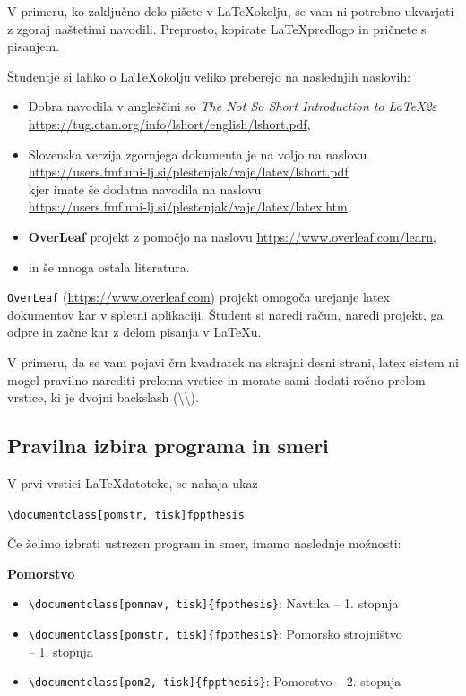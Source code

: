 \documentclass[12pt]{article}
\theoremstyle{definition}
\begin{document}
V primeru, ko zaključno delo pišete v \LaTeX okolju, se vam ni potrebno ukvarjati z zgoraj naštetimi navodili. Preprosto, kopirate \LaTeX predlogo in pričnete s pisanjem.

Študentje si lahko o \LaTeX okolju veliko preberejo na naslednjih naslovih:

\begin{itemize}
	\item Dobra navodila v angleščini so \textit{The Not So Short Introduction to \LaTeX 2$\varepsilon$}\\
	\url{https://tug.ctan.org/info/lshort/english/lshort.pdf},
	\item Slovenska verzija zgornjega dokumenta je na voljo na naslovu\\ \href{https://users.fmf.uni-lj.si/plestenjak/vaje/latex/lshort.pdf}{https://users.fmf.uni-lj.si/plestenjak/vaje/latex/lshort.pdf}\\
	kjer imate še dodatna navodila na naslovu\\
	\href{https://users.fmf.uni-lj.si/plestenjak/vaje/latex/latex.htm}{https://users.fmf.uni-lj.si/plestenjak/vaje/latex/latex.htm}
	\item \textbf{OverLeaf} projekt z pomočjo na naslovu \url{https://www.overleaf.com/learn},
	\item in še mnoga ostala literatura. 
\end{itemize}

\texttt{OverLeaf} (\url{https://www.overleaf.com}) projekt omogoča urejanje latex dokumentov kar v spletni aplikaciji. Študent si naredi račun, naredi projekt, ga odpre in začne kar z delom pisanja v \LaTeX u.

V primeru, da se vam pojavi črn kvadratek na skrajni desni strani, latex sistem ni mogel pravilno narediti preloma vrstice in morate sami dodati ročno prelom vrstice, ki je dvojni backslash (\textbackslash\textbackslash).


\subsection{Pravilna izbira programa in smeri}

V prvi vrstici \LaTeX datoteke, se nahaja ukaz

\texttt{\textbackslash documentclass[pomstr, tisk]{fppthesis}}

Če želimo izbrati ustrezen program in smer, imamo naslednje možnosti:

\textbf{Pomorstvo}
\begin{itemize}[nosep]
	\item \texttt{\textbackslash documentclass[pomnav, tisk]\{fppthesis\}}: Navtika -- 1. stopnja
	\item \texttt{\textbackslash documentclass[pomstr, tisk]\{fppthesis\}}: Pomorsko strojništvo\\
	-- 1. stopnja
	\item \texttt{\textbackslash documentclass[pom2, tisk]\{fppthesis\}}: Pomorstvo -- 2. stopnja
\end{itemize}
\end{document}
